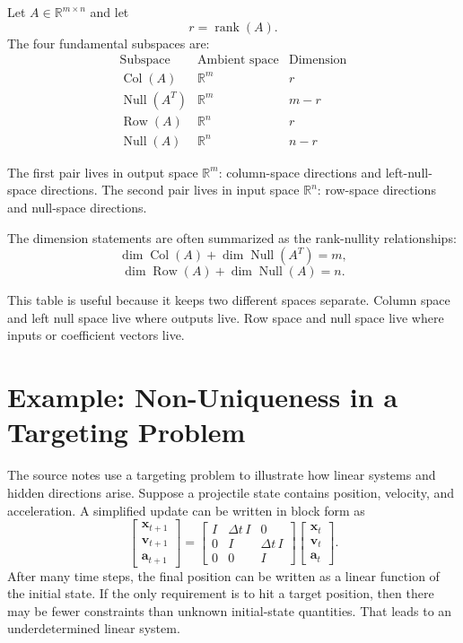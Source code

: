 Let \(A\in\mathbb{R}^{m\times n}\) and let
\[
    r=\operatorname{rank}(A).
\]
The four fundamental subspaces are:
\[
\begin{array}{c|c|c}
\text{Subspace} & \text{Ambient space} & \text{Dimension}\\
\hline
\operatorname{Col}(A) & \mathbb{R}^m & r\\
\operatorname{Null}(A^T) & \mathbb{R}^m & m-r\\
\operatorname{Row}(A) & \mathbb{R}^n & r\\
\operatorname{Null}(A) & \mathbb{R}^n & n-r
\end{array}
\]

The first pair lives in output space \(\mathbb{R}^m\): column-space directions and left-null-space directions. The second pair lives in input space \(\mathbb{R}^n\): row-space directions and null-space directions.

The dimension statements are often summarized as the rank-nullity relationships:
\[
    \dim\operatorname{Col}(A)+\dim\operatorname{Null}(A^T)=m,
\]
\[
    \dim\operatorname{Row}(A)+\dim\operatorname{Null}(A)=n.
\]
\label{mf:rank-nullity}

This table is useful because it keeps two different spaces separate. Column space and left null space live where outputs live. Row space and null space live where inputs or coefficient vectors live.

\section{Example: Non-Uniqueness in a Targeting Problem}
\label{mf:underdetermined-targeting-problem}

The source notes use a targeting problem to illustrate how linear systems and hidden directions arise. Suppose a projectile state contains position, velocity, and acceleration. A simplified update can be written in block form as
\[
\begin{bmatrix}
    \mathbf{x}_{t+1}\\
    \mathbf{v}_{t+1}\\
    \mathbf{a}_{t+1}
\end{bmatrix}
=
\begin{bmatrix}
    I & \Delta t\,I & 0\\
    0 & I & \Delta t\,I\\
    0 & 0 & I
\end{bmatrix}
\begin{bmatrix}
    \mathbf{x}_{t}\\
    \mathbf{v}_{t}\\
    \mathbf{a}_{t}
\end{bmatrix}.
\]
After many time steps, the final position can be written as a linear function of the initial state. If the only requirement is to hit a target position, then there may be fewer constraints than unknown initial-state quantities. That leads to an underdetermined linear system.

